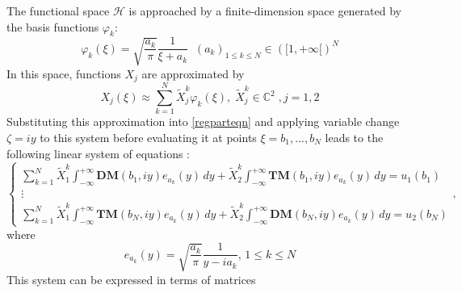 The functional space $\mathcal{H}$ is approached by a finite-dimension space generated by the basis functions $\varphi_k$:
\begin{equation}
\varphi_k(\xi)= \sqrt{\frac{a_k}{\pi}} \frac{1}{\xi+a_k} \; \; (a_k)_{1 \leq k \leq N} \in (\lbrack 1, + \infty \lbrack)^N
\end{equation}
In this space, functions $X_j$ are approximated by
\begin{equation}
X_j(\xi) \approx \sum_{k=1}^N \tilde{X}_j^k \varphi_k(\xi), \; \tilde{X}_j^k \in \mathbb{C}^2 \;, j=1,2
\label{Xj}
\end{equation}
Substituting this approximation into \eqref{regparteqn} and applying 
variable change $\zeta=iy$ to this system before evaluating it at points $\xi=b_1,...,b_N$ leads to the following linear system of equations :
\begin{equation}
\left\{
\begin{matrix}
\sum_{k=1}^N \tilde{X}_1^k \int_{-\infty}^{+\infty} \textbf{DM}(b_1,iy)e_{a_k}(y) \, dy + \tilde{X}_2^k \int_{-\infty}^{+\infty} \textbf{TM}(b_1,iy)e_{a_k}(y) \, dy=u_1(b_1) \\
\vdots\\
\sum_{k=1}^N \tilde{X}_1^k \int_{-\infty}^{+\infty} \textbf{TM}(b_N,iy)e_{a_k}(y) \, dy + \tilde{X}_2^k \int_{-\infty}^{+\infty} \textbf{DM}(b_N,iy)e_{a_k}(y) \, dy=u_2(b_N)
\end{matrix}
\right.,
\label{linsys}
\end{equation}
where
\begin{equation}
e_{a_k}(y)=\sqrt{\frac{a_k}{\pi}} \frac{1}{y-ia_k} , \, 1 \leq k \leq N
\end{equation}
This system can be expressed in terms of matrices
